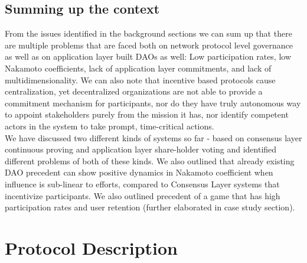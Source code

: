 \documentclass{article}
\begin{document}
\begin{CJK}{UTF8}{gbsn}
\begin{multicols}{2}
\subsection{Summing up the context}
From the issues identified in the background sections we can sum up that there are multiple problems that are faced both on network protocol level governance as well as on application layer built DAOs as well: Low participation rates, low Nakamoto coefficients, lack of application layer commitments, and lack of multidimensionality.
We can also note that incentive based protocols cause centralization, yet decentralized organizations are not able to provide a commitment mechanism for participants, nor do they have truly autonomous way to appoint stakeholders purely from the mission it has, nor identify competent actors in the system to take prompt, time-critical actions.\\
We have discussed two different kinds of systems so far - based on consensus layer continuous proving and application layer share-holder voting and identified different problems of both of these kinds.
We also outlined that already existing DAO precedent can show positive dynamics in Nakamoto coefficient when influence is sub-linear to efforts, compared to Consensus Layer systems that incentivize participants. We also outlined precedent of a game that has high participation rates and user retention (further elaborated in case study section).\\

\section{Protocol Description}


\end{multicols}
\end{CJK}
\end{document}
